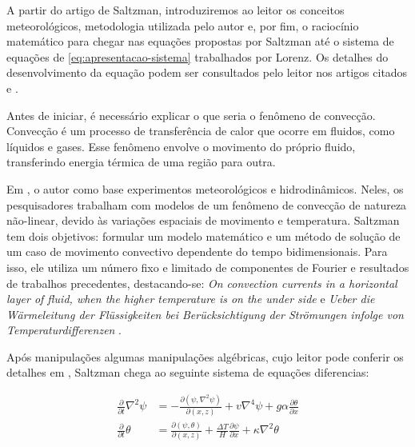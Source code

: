 \documentclass[12pt, a4paper]{article}
\begin{document}
    A partir do artigo de Saltzman, introduziremos ao leitor os conceitos
    meteorológicos, metodologia utilizada pelo autor e, por fim, o raciocínio
    matemático para chegar nas equações propostas por Saltzman até o sistema de
    equações de \eqref{eq:apresentacao-sistema} trabalhados por Lorenz. Os detalhes
    do desenvolvimento da equação podem ser consultados pelo leitor nos artigos
    citados \cite{Lorenz1963} e \cite{Saltzman1962}.
    
    Antes de iniciar, é necessário explicar o que seria o fenômeno de
    convecção. Convecção é um processo de transferência de calor que ocorre em
    fluidos, como líquidos e gases. Esse fenômeno envolve o movimento do próprio
    fluido, transferindo energia térmica de uma região para outra.
    
    Em \cite{Saltzman1962}, o autor como base experimentos meteorológicos e
    hidrodinâmicos. Neles, os pesquisadores trabalham com modelos de um fenômeno de
    convecção de natureza não-linear, devido às variações espaciais de movimento e
    temperatura. Saltzman tem dois objetivos: formular um modelo matemático e um
    método de solução de um caso de movimento convectivo dependente do tempo
    bidimensionais. Para isso, ele utiliza um número fixo e limitado de componentes
    de Fourier e resultados de trabalhos precedentes, destacando-se: \textit{On
        convection currents in a horizontal layer of fluid, when the higher
        temperature
        is on the under side} \cite{Rayleigh1916} e \textit{Ueber die Wärmeleitung
        der
        Flüssigkeiten bei Berücksichtigung der Strömungen infolge von
        Temperaturdifferenzen} \cite{Oberbeck1879}.
    
    Após manipulações algumas manipulações algébricas, cujo leitor pode
    conferir os detalhes em \cite{Saltzman1962}, Saltzman chega ao seguinte sistema
    de equações diferencias:
    
    \begin{align}
        \frac{\partial}{\partial t} \nabla^2 \psi & = - \frac{\partial (\psi,
            \nabla^2 \psi)}{\partial (x,z)} + v \nabla^4 \psi + g \alpha
        \frac{\partial
        \theta}{\partial x} \label{saltzman-1}                                \\
        \frac{\partial}{\partial t} \theta        & = \frac{\partial (\psi,
            \theta)}{\partial (x,z)} + \frac{\Delta T}{H} \frac{\partial
            \psi}{\partial x}
        + \kappa \nabla^2 \theta \label{saltzman-2}
    \end{align}
    
\end{document}
